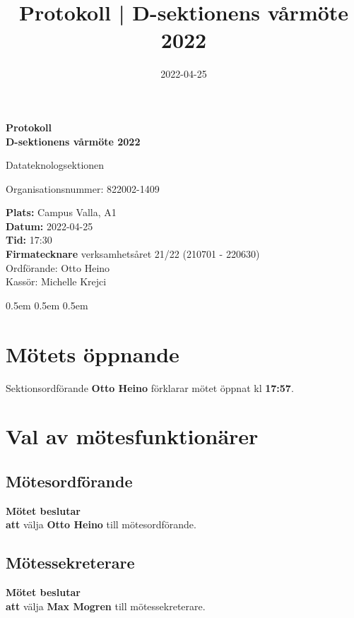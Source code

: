 \documentclass{datateknologsektionen-document}
\title{Protokoll | D-sektionens vårmöte 2022}
\date{2022-04-25}
\newcommand{\ind}{\hspace*{2em}}
\newcommand{\motetbeslutar}{\textbf{Mötet beslutar}}
\newcommand{\att}{\\\ind\textbf{att}}
\begin{document}
\hspace{0pt}
\vfill
\begin{center}
    \Huge\textbf{Protokoll \\ D-sektionens vårmöte 2022}

    \huge Datateknologsektionen

    \large
    Organisationsnummer: 822002-1409

\end{center}
\vfill
{\large
    \textbf{Plats:} Campus Valla, A1 \\
    \textbf{Datum:} 2022-04-25 \\
    \textbf{Tid:} 17:30 \\
    \textbf{Firmatecknare} verksamhetsåret 21/22 (210701 - 220630) \\
    \ind Ordförande: Otto Heino \\
    \ind Kassör: Michelle Krejci 
}
\vfill
\hspace{0pt}
\pagebreak




\advance\cftsecnumwidth 0.5em\relax
\advance\cftsubsecindent 0.5em\relax
\advance\cftsubsecnumwidth 0.5em\relax
\tableofcontents
\pagebreak





\section{Mötets öppnande}
Sektionsordförande \textbf{Otto Heino} förklarar mötet öppnat kl \textbf{17:57}.




\section{Val av mötesfunktionärer}
\subsection{Mötesordförande}
\motetbeslutar\att{} välja \textbf{Otto Heino} till mötesordförande.

\subsection{Mötessekreterare}
\motetbeslutar\att{} välja \textbf{Max Mogren} till mötessekreterare.
\end{document}
